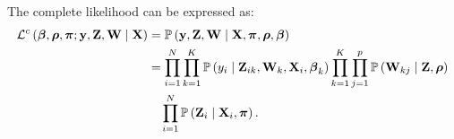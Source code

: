 The complete likelihood can be expressed as:
%
\begin{align}
    \mathcal{L}^c\left(\bbeta, \brho, \bpi; \by,\bZ,\bW \mid \bX\right) &= \p\left(\by,\bZ,\bW \mid \bX, \bpi, \brho, \bbeta   \right) \notag \\
    &= \prod_{i=1}^N \prod_{k=1}^K \p\left(y_i \mid \bZ_{i k},\bW_{k},\bX_i, \bbeta_k   \right)
    \prod_{k=1}^K \prod_{j=1}^p \p\left(\bW_{kj} \mid \bZ,  \brho \right) \notag \\
    &\quad \prod_{i=1}^N  \p\left(\bZ_{i} \mid  \bX_i, \bpi   \right).
\end{align}










